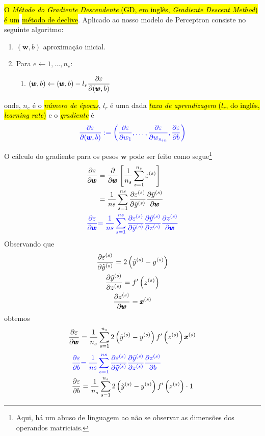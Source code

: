 \hl{O \emph{Método do Gradiente Descendente} (GD, em inglês, \textit{Gradiente Descent Method}) é um }\href{https://notaspedrok.com.br/notas/MatematicaNumericaAvancada/cap_otimizacao_sec_minimi.html}{\hl{método de declive}}. Aplicado ao nosso modelo de Perceptron consiste no seguinte algoritmo:
\begin{enumerate}
\item $(\pmb{w}, b)$ aproximação inicial.
\item Para $e\leftarrow 1, \dotsc, n_e$:
  \begin{enumerate}
  \item $\displaystyle (\pmb{w}, b) \leftarrow (\pmb{w}, b) - l_r\frac{\partial\varepsilon}{\partial (\pmb{w}, b)}$
  \end{enumerate}
\end{enumerate}
onde, $n_e$ é o \hl{\emph{número de épocas}}, $l_r$ é uma dada \hl{\emph{taxa de aprendizagem} ($l_r$, do inglês, \textit{learning rate})} e o \hl{\emph{gradiente}} é
\begin{equation}\color{blue}\frac{\partial\varepsilon}{\partial (\pmb{w}, b)} := \left(\frac{\partial\varepsilon}{\partial w_1}, \dotsc, \frac{\partial\varepsilon}{\partial w_{n_{in}}}, \frac{\partial\varepsilon}{\partial b}\right)
\end{equation}

O cálculo do gradiente para os pesos $\pmb{w}$ pode ser feito como segue\footnote{Aqui, há um abuso de linguagem ao não se observar as dimensões dos operandos matriciais.}
\begin{align}
  \frac{\partial\varepsilon}{\partial \pmb{w}} &= \frac{\partial}{\partial\pmb{w}}\left[\frac{1}{n_s}\sum_{s=1}^{n_s}\varepsilon^{(s)}\right]\\
                                   &= \frac{1}{ns}\sum_{s=1}^{ns}\frac{\partial\varepsilon^{(s)}}{\partial\tilde{y}^{(s)}}\frac{\partial\tilde{y}^{(s)}}{\partial\pmb{w}}\\
  {\color{blue}\frac{\partial\varepsilon}{\partial \pmb{w}}} &{\color{blue}= \frac{1}{ns}\sum_{s=1}^{ns}\frac{\partial\varepsilon^{(s)}}{\partial\tilde{y}^{(s)}}\frac{\partial\tilde{y}^{(s)}}{\partial z^{(s)}}\frac{\partial z^{(s)}}{\partial\pmb{w}}}
\end{align}
Observando que
\begin{gather}
  \frac{\partial\varepsilon^{(s)}}{\partial\tilde{y}^{(s)}} = 2\left(\tilde{y}^{(s)} - y^{(s)}\right)\\
  \frac{\partial\tilde{y}^{(s)}}{\partial z^{(s)}} = f'\left(z^{(s)}\right)\\
  \frac{\partial z^{(s)}}{\partial\pmb{w}} = \pmb{x}^{(s)}
\end{gather}
obtemos
\begin{equation}
  \frac{\partial\varepsilon}{\partial \pmb{w}} = \frac{1}{n_s}\sum_{s=1}^{n_s}2\left(\tilde{y}^{(s)}-y^{(s)}\right)f'\left(z^{(s)}\right)\pmb{x}^{(s)}
\end{equation}
\begin{align}
  {\color{blue}\frac{\partial\varepsilon}{\partial b}} &{\color{blue}= \frac{1}{ns}\sum_{s=1}^{ns}\frac{\partial\varepsilon^{(s)}}{\partial\tilde{y}^{(s)}}\frac{\partial\tilde{y}^{(s)}}{\partial z^{(s)}}\frac{\partial z^{(s)}}{\partial b}}\\
  \frac{\partial\varepsilon}{\partial b} &= \frac{1}{n_s}\sum_{s=1}^{n_s}2\left(\tilde{y}^{(s)}-y^{(s)}\right)f'\left(z^{(s)}\right)\cdot 1
\end{align}

